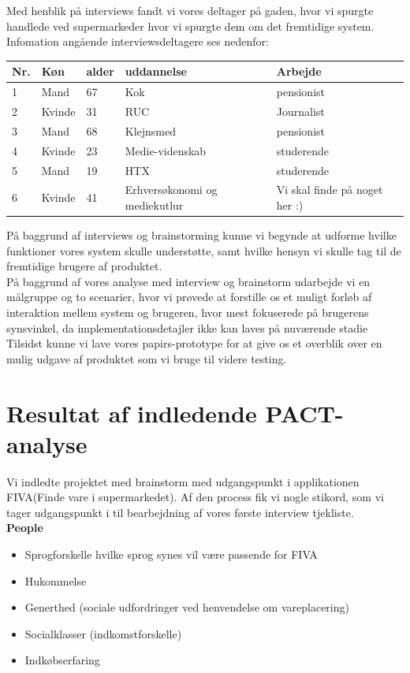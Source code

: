 \documentclass[12pt]{article}
\begin{document}
Med henblik på interviews fandt vi vores deltager på gaden, hvor vi spurgte handlede ved supermarkeder hvor vi spurgte dem om det fremtidige system.\\
Infomation angående interviewsdeltagere ses nedenfor:
\begin{center}
    \begin{tabular}{ |l | l | l | l | l |}
    \hline
    \textbf{Nr.} & \textbf{Køn} & \textbf{alder} & \textbf{uddannelse} & \textbf{Arbejde}\\ \hline
    1 & Mand & 67 & Kok & pensionist \\ \hline
    2 & Kvinde & 31 & RUC & Journalist \\ \hline
    3 & Mand & 68 & Klejnsmed & pensionist \\ \hline
    4 & Kvinde & 23 & Medie-videnskab & studerende \\ \hline
    5 & Mand & 19 & HTX & studerende \\ \hline
    6 & Kvinde & 41 & Erhversøkonomi og mediekutlur & Vi skal finde på noget her :) \\ \hline
     \end{tabular}
\end{center}
På baggrund af interviews og brainstorming kunne vi begynde at udforme hvilke funktioner vores system skulle understøtte, samt hvilke hensyn vi skulle tag til de fremtidige brugere af produktet.\\
På baggrund af vores analyse med interview og brainstorm udarbejde vi en målgruppe og to scenarier, hvor vi prøvede at forstille os et muligt forløb af interaktion mellem system og brugeren, hvor mest fokuserede på brugerens synsvinkel, da implementationsdetajler ikke kan laves på nuværende stadie\\
Tilsidst kunne vi lave vores papirs-prototype for at give os et overblik over en mulig udgave af produktet som vi bruge til videre testing.

\newpage
\section{Resultat af indledende PACT-analyse}
Vi indledte projektet med brainstorm med udgangspunkt i applikationen FIVA(Finde vare i supermarkedet). Af den process fik vi nogle stikord, som vi tager udgangspunkt i til bearbejdning af vores første interview tjekliste.\\
 
\noindent \textbf{People}
\begin{itemize} 
\item Sprogforskelle hvilke sprog synes vil være passende for FIVA
\item Hukommelse 
\item Generthed (sociale udfordringer ved henvendelse om vareplacering)
\item Socialklasser (indkomstforskelle)
\item Indkøbserfaring\\
\end{itemize}
\end{document}
